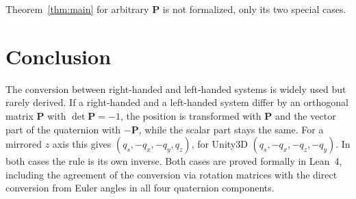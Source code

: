\documentclass{article}
\theoremstyle{plain}
\theoremstyle{definition}
\newcommand{\vect}[1]{\boldsymbol{#1}}
\begin{document}
Theorem~\ref{thm:main} for arbitrary $\vect P$ is not formalized, only its two special cases.

\section{Conclusion}\label{sec:conclusion}

The conversion between right-handed and left-handed systems is widely used but rarely derived.
If a right-handed and a left-handed system differ by an orthogonal matrix $\vect P$ with
$\det \vect P = -1$, the position is transformed with $\vect P$ and the vector part of the
quaternion with $-\vect P$, while the scalar part stays the same. For a mirrored $z$ axis this
gives $(q_s, -q_x, -q_y, q_z)$, for Unity3D $(q_s, -q_x, -q_z, -q_y)$. In both cases the rule is its
own inverse. Both cases are proved formally in Lean~4, including the agreement of the conversion via
rotation matrices with the direct conversion from Euler angles in all four quaternion components.



\end{document}
